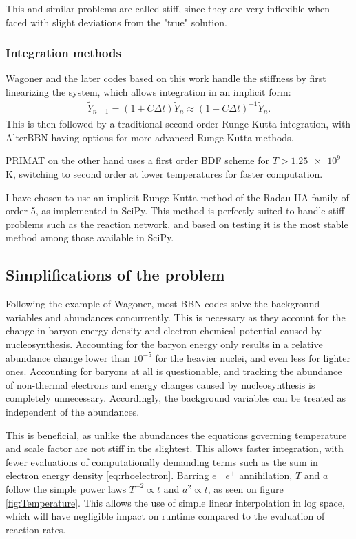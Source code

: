 This and similar problems are called stiff, since they are very inflexible when faced with slight deviations from the "true" solution. 


\subsubsection{Integration methods}

Wagoner and the later codes based on this work handle the stiffness by first linearizing the system, which allows integration in an implicit form:
\begin{align}
    \tilde{Y}_{n+1}=(1+C \Delta t)\tilde{Y}_{n}\approx(1-C \Delta t)^{-1}\tilde{Y}_{n}.
\end{align}
This is then followed by a traditional second order Runge-Kutta integration, with AlterBBN having options for more advanced Runge-Kutta methods. 

PRIMAT on the other hand uses a first order BDF scheme for $T>\num{1.25e9}$ K, switching to second order at lower temperatures for faster computation.

I have chosen to use an implicit Runge-Kutta method of the Radau IIA family of order 5, as implemented in SciPy\cite{SciPy}. This method is perfectly suited to handle stiff problems such as the reaction network, and based on testing it is the most stable method among those available in SciPy.

\subsection{Simplifications of the problem}
Following the example of Wagoner, most BBN codes solve the background variables and abundances concurrently. This is necessary as they account for the change in baryon energy density and electron chemical potential caused by nucleosynthesis. Accounting for the baryon energy only results in a relative abundance change lower than $10^{-5}$ for the heavier nuclei, and even less for lighter ones. Accounting for baryons at all is questionable, and tracking the abundance of non-thermal electrons and energy changes caused by nucleosynthesis is completely unnecessary. Accordingly, the background variables can be treated as independent of the abundances.

This is beneficial, as unlike the abundances the equations governing temperature and scale factor are not stiff in the slightest. This allows faster integration, with fewer evaluations of computationally demanding terms such as the sum in electron energy density \eqref{eq:rhoelectron}. Barring $e^-$ $e^+$ annihilation, $T$ and $a$ follow the simple power laws $T^{-2}\propto t$ and $a^2\propto t$, as seen on figure \ref{fig:Temperature}. This allows the use of simple linear interpolation in log space, which will have negligible impact on runtime compared to the evaluation of reaction rates.

